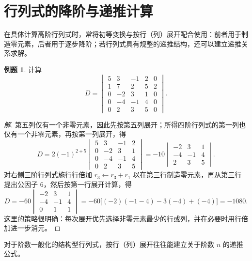 \documentclass[UTF8, fontset=fandol, a4paper, 12pt]{ctexart}
\theoremstyle{definition}
\newtheorem{example}[theorem]{例题}
\begin{document}
\section{行列式的降阶与递推计算}

在具体计算高阶行列式时，常将初等变换与按行（列）展开配合使用：前者用于制造零元素，后者用于逐步降阶；若行列式具有规整的递推结构，还可以建立递推关系求解。

\begin{example}
计算
\[
 D=\begin{vmatrix}
 5&3&-1&2&0\\1&7&2&5&2\\0&-2&3&1&0\\0&-4&-1&4&0\\0&2&3&5&0
 \end{vmatrix}.
\]
\end{example}
\begin{proof}[解]
第五列仅有一个非零元素，因此先按第五列展开；所得四阶行列式的第一列也仅有一个非零元素，再按第一列展开，得
\[
 D=2(-1)^{2+5}
 \begin{vmatrix}5&3&-1&2\\0&-2&3&1\\0&-4&-1&4\\0&2&3&5\end{vmatrix}
 =-10\begin{vmatrix}-2&3&1\\-4&-1&4\\2&3&5\end{vmatrix}.
\]
对右侧三阶行列式施行行倍加 $r_3\leftarrow r_3+r_1$ 以在第三行制造零元素，再从第三行提出公因子 $6$，然后按第一行展开计算，得
\[
 D=-60\begin{vmatrix}-2&3&1\\-4&-1&4\\0&1&1\end{vmatrix}
 =-60\bigl[(-2)(-1-4)-3(-4)+(-4)\bigr]
 =\boxed{-1080}.
\]
这里的策略很明确：每次展开优先选择非零元素最少的行或列，并在必要时用行倍加进一步消元。
\end{proof}

对于阶数一般化的结构型行列式，按行（列）展开往往能建立关于阶数 $n$ 的递推公式。
\end{document}
